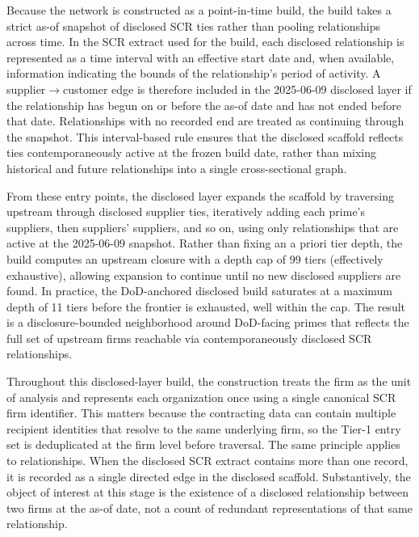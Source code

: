 Because the network is constructed as a point-in-time build, the build takes a strict as-of snapshot of disclosed SCR ties rather than pooling relationships across time. In the SCR extract used for the build, each disclosed relationship is represented as a time interval with an effective start date and, when available, information indicating the bounds of the relationship's period of activity. A supplier$\rightarrow$customer edge is therefore included in the \mbox{2025-06-09} disclosed layer if the relationship has begun on or before the as-of date and has not ended before that date. Relationships with no recorded end are treated as continuing through the snapshot. This interval-based rule ensures that the disclosed scaffold reflects ties contemporaneously active at the frozen build date, rather than mixing historical and future relationships into a single cross-sectional graph.

From these entry points, the disclosed layer expands the scaffold by traversing upstream through disclosed supplier ties, iteratively adding each prime's suppliers, then suppliers' suppliers, and so on, using only relationships that are active at the \mbox{2025-06-09} snapshot. Rather than fixing an a priori tier depth, the build computes an upstream closure with a depth cap of 99 tiers (effectively exhaustive), allowing expansion to continue until no new disclosed suppliers are found. In practice, the DoD-anchored disclosed build saturates at a maximum depth of 11 tiers before the frontier is exhausted, well within the cap. The result is a disclosure-bounded neighborhood around DoD-facing primes that reflects the full set of upstream firms reachable via contemporaneously disclosed SCR relationships.

Throughout this disclosed-layer build, the construction treats the firm as the unit of analysis and represents each organization once using a single canonical SCR firm identifier. This matters because the contracting data can contain multiple recipient identities that resolve to the same underlying firm, so the Tier-1 entry set is deduplicated at the firm level before traversal. The same principle applies to relationships. When the disclosed SCR extract contains more than one record, it is recorded as a single directed edge in the disclosed scaffold. Substantively, the object of interest at this stage is the existence of a disclosed relationship between two firms at the as-of date, not a count of redundant representations of that same relationship.

